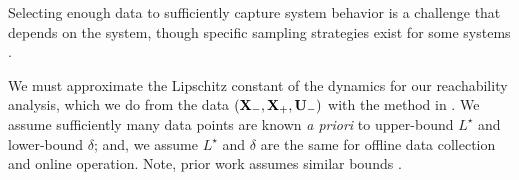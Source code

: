 Selecting enough data to sufficiently capture system behavior is a challenge that depends on the system, though specific sampling strategies exist for some systems \cite{conf:modelBasedReachRL}.

We must approximate the Lipschitz constant of the dynamics for our reachability analysis, which we do from the data $({\mathbf{X}}_-,{\mathbf{X}}_+,{\mathbf{U}}_-)$ with the method in \cite[Section 4, Remark 1]{alanwar2020data_conf}.
We assume sufficiently many data points are known \emph{a priori} to upper-bound $L^\star$ and lower-bound $\delta$; and, we assume $L^\star$ and $\delta$ are the same for offline data collection and online operation. 
Note, prior work assumes similar bounds \cite{koller2018learning,alanwar2020data_conf}.



